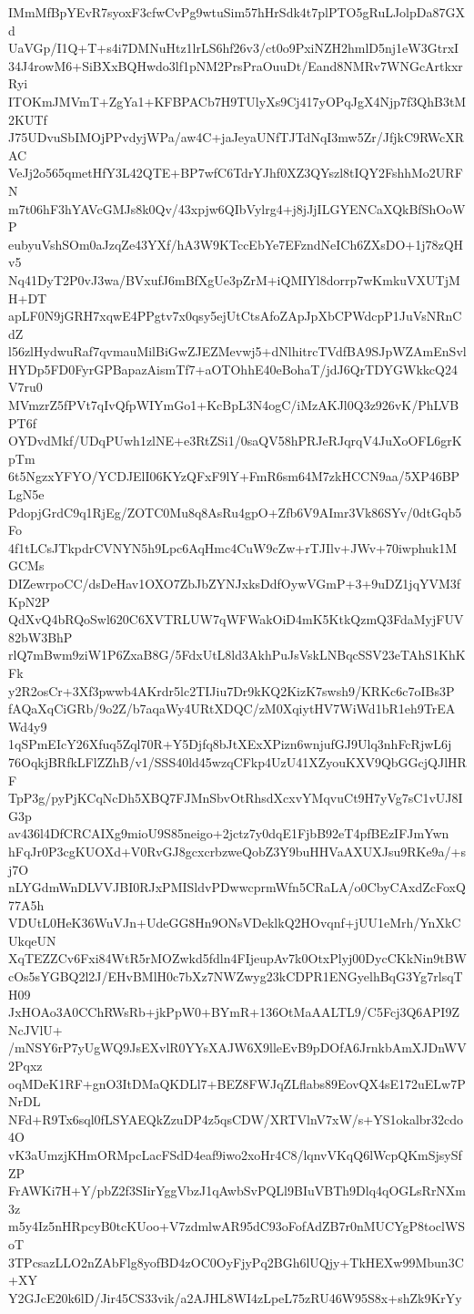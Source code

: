 IMmMfBpYEvR7syoxF3cfwCvPg9wtuSim57hHrSdk4t7plPTO5gRuLJolpDa87GXd
UaVGp/I1Q+T+s4i7DMNuHtz1lrLS6hf26v3/ct0o9PxiNZH2hmlD5nj1eW3GtrxI
34J4rowM6+SiBXxBQHwdo3lf1pNM2PrsPraOuuDt/Eand8NMRv7WNGcArtkxrRyi
ITOKmJMVmT+ZgYa1+KFBPACb7H9TUlyXs9Cj417yOPqJgX4Njp7f3QhB3tM2KUTf
J75UDvuSbIMOjPPvdyjWPa/aw4C+jaJeyaUNfTJTdNqI3mw5Zr/JfjkC9RWcXRAC
VeJj2o565qmetHfY3L42QTE+BP7wfC6TdrYJhf0XZ3QYszl8tIQY2FshhMo2URFN
m7t06hF3hYAVcGMJs8k0Qv/43xpjw6QIbVylrg4+j8jJjILGYENCaXQkBfShOoWP
eubyuVshSOm0aJzqZe43YXf/hA3W9KTccEbYe7EFzndNeICh6ZXsDO+1j78zQHv5
Nq41DyT2P0vJ3wa/BVxufJ6mBfXgUe3pZrM+iQMIYl8dorrp7wKmkuVXUTjMH+DT
apLF0N9jGRH7xqwE4PPgtv7x0qsy5ejUtCtsAfoZApJpXbCPWdcpP1JuVsNRnCdZ
l56zlHydwuRaf7qvmauMilBiGwZJEZMevwj5+dNlhitrcTVdfBA9SJpWZAmEnSvl
HYDp5FD0FyrGPBapazAismTf7+aOTOhhE40eBohaT/jdJ6QrTDYGWkkcQ24V7ru0
MVmzrZ5fPVt7qIvQfpWIYmGo1+KcBpL3N4ogC/iMzAKJl0Q3z926vK/PhLVBPT6f
OYDvdMkf/UDqPUwh1zlNE+e3RtZSi1/0saQV58hPRJeRJqrqV4JuXoOFL6grKpTm
6t5NgzxYFYO/YCDJElI06KYzQFxF9lY+FmR6sm64M7zkHCCN9aa/5XP46BPLgN5e
PdopjGrdC9q1RjEg/ZOTC0Mu8q8AsRu4gpO+Zfb6V9AImr3Vk86SYv/0dtGqb5Fo
4f1tLCsJTkpdrCVNYN5h9Lpc6AqHmc4CuW9cZw+rTJIlv+JWv+70iwphuk1MGCMs
DIZewrpoCC/dsDeHav1OXO7ZbJbZYNJxksDdfOywVGmP+3+9uDZ1jqYVM3fKpN2P
QdXvQ4bRQoSwl620C6XVTRLUW7qWFWakOiD4mK5KtkQzmQ3FdaMyjFUV82bW3BhP
rlQ7mBwm9ziW1P6ZxaB8G/5FdxUtL8ld3AkhPuJsVskLNBqcSSV23eTAhS1KhKFk
y2R2osCr+3Xf3pwwb4AKrdr5lc2TIJiu7Dr9kKQ2KizK7swsh9/KRKc6c7oIBs3P
fAQaXqCiGRb/9o2Z/b7aqaWy4URtXDQC/zM0XqiytHV7WiWd1bR1eh9TrEAWd4y9
1qSPmEIcY26Xfuq5Zql70R+Y5Djfq8bJtXExXPizn6wnjufGJ9Ulq3nhFcRjwL6j
76OqkjBRfkLFlZZhB/v1/SSS40ld45wzqCFkp4UzU41XZyouKXV9QbGGcjQJlHRF
TpP3g/pyPjKCqNcDh5XBQ7FJMnSbvOtRhsdXcxvYMqvuCt9H7yVg7sC1vUJ8IG3p
av436l4DfCRCAIXg9mioU9S85neigo+2jctz7y0dqE1FjbB92eT4pfBEzIFJmYwn
hFqJr0P3cgKUOXd+V0RvGJ8gcxcrbzweQobZ3Y9buHHVaAXUXJsu9RKe9a/+sj7O
nLYGdmWnDLVVJBI0RJxPMISldvPDwwcprmWfn5CRaLA/o0CbyCAxdZcFoxQ77A5h
VDUtL0HeK36WuVJn+UdeGG8Hn9ONsVDeklkQ2HOvqnf+jUU1eMrh/YnXkCUkqeUN
XqTEZZCv6Fxi84WtR5rMOZwkd5fdln4FIjeupAv7k0OtxPlyj00DycCKkNin9tBW
cOs5sYGBQ2l2J/EHvBMlH0c7bXz7NWZwyg23kCDPR1ENGyelhBqG3Yg7rlsqTH09
JxHOAo3A0CChRWsRb+jkPpW0+BYmR+136OtMaAALTL9/C5Fcj3Q6API9ZNcJVlU+
/mNSY6rP7yUgWQ9JsEXvlR0YYsXAJW6X9lleEvB9pDOfA6JrnkbAmXJDnWV2Pqxz
oqMDeK1RF+gnO3ItDMaQKDLl7+BEZ8FWJqZLflabs89EovQX4sE172uELw7PNrDL
NFd+R9Tx6sql0fLSYAEQkZzuDP4z5qsCDW/XRTVlnV7xW/s+YS1okalbr32cdo4O
vK3aUmzjKHmORMpcLacFSdD4eaf9iwo2xoHr4C8/lqnvVKqQ6lWcpQKmSjsySfZP
FrAWKi7H+Y/pbZ2f3SIirYggVbzJ1qAwbSvPQLl9BIuVBTh9Dlq4qOGLsRrNXm3z
m5y4Iz5nHRpcyB0tcKUoo+V7zdmlwAR95dC93oFofAdZB7r0nMUCYgP8toclWSoT
3TPcsazLLO2nZAbFlg8yofBD4zOC0OyFjyPq2BGh6lUQjy+TkHEXw99Mbun3C+XY
Y2GJcE20k6lD/Jir45CS33vik/a2AJHL8WI4zLpeL75zRU46W95S8x+shZk9KrYy
